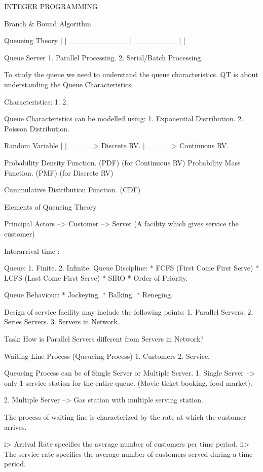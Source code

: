 						INTEGER PROGRAMMING

						Branch & Bound Algorithm



						Queueing Theory
								|
								|
				___________ | ________
				|							|

				Queue                         Server
									1. Parallel Processing.
									2. Serial/Batch Processing.

To study the queue we need to understand the queue characteristics.
QT is about understanding the Queue Characteristics.

Characteristics:
1.
2.

Queue Characteristics can be modelled using:
1. Exponential Distribution.
2. Poisson Distribution.

Random Variable
|
|_____>  Discrete RV.
|_____> Continuous RV.

Probability Density Function. (PDF) (for Continuous RV)
Probability Mass Function. (PMF) (for Discrete RV)

Cummulative Distribution Function. (CDF)

Elements of Queueing Theory

Principal Actors
--> Customer
--> Server (A facility which gives service the customer)

Interarrival time : 

Queue:
1. Finite.
2. Infinite.
Queue Discipline:
* FCFS (First Come First Serve)
* LCFS (Last Come First Serve)
* SIRO
* Order of Priority.

Queue Behaviour:
* Jockeying.
* Balking.
* Reneging.

Design of service facility may include the following points:
1. Parallel Servers.
2. Series Servers.
3. Servers in Network.

Task: How is Parallel Servers different from Servers in Network?


Waiting Line Process (Queueing Process)
1. Customers
2. Service.

Queueing Process can be of Single Server or Multiple Server.
1. Single Server --> only 1 service station for the entire queue. (Movie ticket booking, food market).

2. Multiple Server --> Gas station with multiple serving station.

The process of waiting line is characterized by the rate at which the customer arrives. 

i> Arrival Rate specifies the average number of customers per time period.
ii> The service rate specifies the average number of customers served during a time period.

